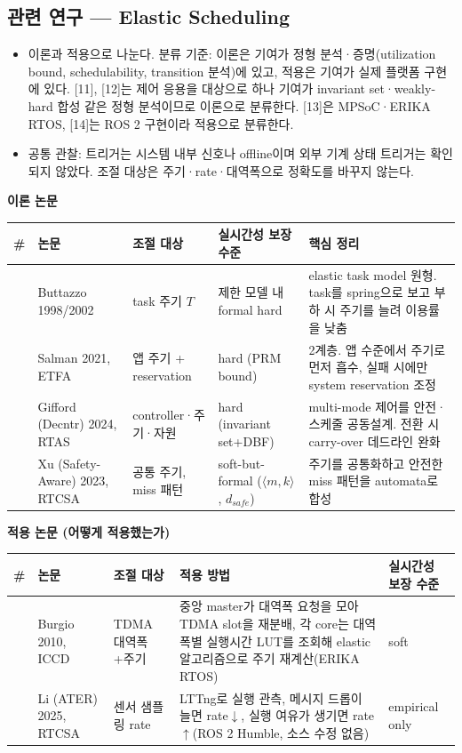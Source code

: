 \documentclass[10pt]{article}
\begin{document}
\subsection{관련 연구 --- Elastic Scheduling}
\begin{itemize}
\item 이론과 적용으로 나눈다. 분류 기준: 이론은 기여가 정형 분석·증명(utilization bound, schedulability, transition 분석)에 있고, 적용은 기여가 실제 플랫폼 구현에 있다. [11], [12]는 제어 응용을 대상으로 하나 기여가 invariant set·weakly-hard 합성 같은 정형 분석이므로 이론으로 분류한다. [13]은 MPSoC·ERIKA RTOS, [14]는 ROS 2 구현이라 적용으로 분류한다.
\item 공통 관찰: 트리거는 시스템 내부 신호나 offline이며 외부 기계 상태 트리거는 확인되지 않았다. 조절 대상은 주기·rate·대역폭으로 정확도를 바꾸지 않는다.
\end{itemize}
\noindent\textbf{이론 논문}
\begin{center}\scriptsize
\begin{tabular}{@{}cL{2.4cm}L{2.6cm}L{2.4cm}L{5.4cm}@{}}
\toprule
\# & 논문 & 조절 대상 & 실시간성 보장 수준 & 핵심 정리 \\ \midrule
[9] & Buttazzo 1998/2002 & task 주기 $T$ & 제한 모델 내 formal hard & elastic task model 원형. task를 spring으로 보고 부하 시 주기를 늘려 이용률을 낮춤 \\
[10] & Salman 2021, ETFA & 앱 주기 + reservation & hard (PRM bound) & 2계층. 앱 수준에서 주기로 먼저 흡수, 실패 시에만 system reservation 조정 \\
[11] & Gifford (Decntr) 2024, RTAS & controller·주기·자원 & hard (invariant set+DBF) & multi-mode 제어를 안전·스케줄 공동설계. 전환 시 carry-over 데드라인 완화 \\
[12] & Xu (Safety-Aware) 2023, RTCSA & 공통 주기, miss 패턴 & soft-but-formal ($\langle m,k\rangle$, $d_{safe}$) & 주기를 공통화하고 안전한 miss 패턴을 automata로 합성 \\
\bottomrule
\end{tabular}
\end{center}
\noindent\textbf{적용 논문 (어떻게 적용했는가)}
\begin{center}\scriptsize
\begin{tabular}{@{}cL{2.2cm}L{2.4cm}L{6.0cm}L{2.4cm}@{}}
\toprule
\# & 논문 & 조절 대상 & 적용 방법 & 실시간성 보장 수준 \\ \midrule
[13] & Burgio 2010, ICCD & TDMA 대역폭+주기 & 중앙 master가 대역폭 요청을 모아 TDMA slot을 재분배, 각 core는 대역폭별 실행시간 LUT를 조회해 elastic 알고리즘으로 주기 재계산(ERIKA RTOS) & soft \\
[14] & Li (ATER) 2025, RTCSA & 센서 샘플링 rate & LTTng로 실행 관측, 메시지 드롭이 늘면 rate$\downarrow$, 실행 여유가 생기면 rate$\uparrow$(ROS 2 Humble, 소스 수정 없음) & empirical only \\
\bottomrule
\end{tabular}
\end{center}
\end{document}
